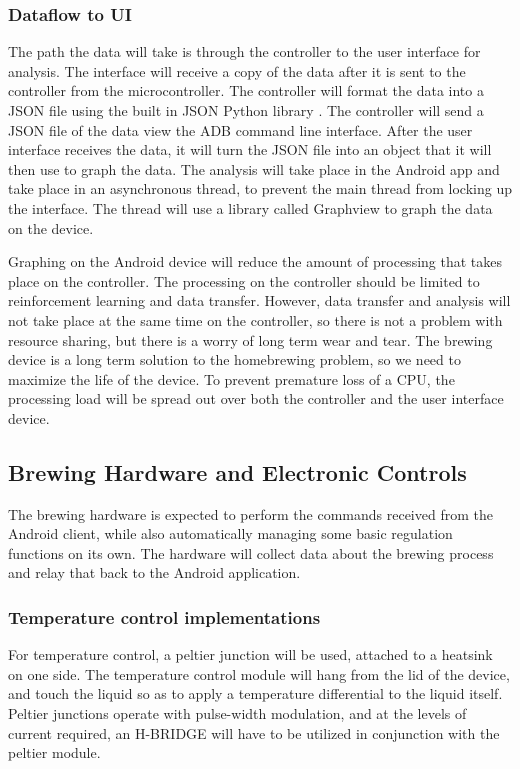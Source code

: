 \documentclass[draftclsnofoot,onecolumn,letterpaper,10pt]{IEEEtran}
\begin{document}
\subsubsection{Dataflow to UI}
The path the data will take is through the controller to the user interface for analysis.
The interface will receive a copy of the data after it is sent to the controller from the microcontroller.
The controller will format the data into a JSON file using the built in JSON Python library \cite{JSONPython}.
The controller will send a JSON file of the data view the ADB command line interface.
After the user interface receives the data, it will turn the JSON file into an object that it will then use to graph the data.
The analysis will take place in the Android app and take place in an asynchronous thread, to prevent the main thread from locking up the interface.
The thread will use a library called Graphview to graph the data on the device. \cite{Graphview}

Graphing on the Android device will reduce the amount of processing that takes place on the controller.
The processing on the controller should be limited to reinforcement learning and data transfer.
However, data transfer and analysis will not take place at the same time on the controller, so there is not a problem with resource sharing, but there is a worry of long term wear and tear.
The brewing device is a long term solution to the homebrewing problem, so we need to maximize the life of the device.
To prevent premature loss of a CPU, the processing load will be spread out over both the controller and the user interface device.

\subsection{Brewing Hardware and Electronic Controls} %
The brewing hardware is expected to perform the commands received from the Android client, while also automatically managing
some basic regulation functions on its own. The hardware will collect data about the brewing process and relay that back to the
Android application.

\subsubsection{Temperature control implementations}
For temperature control, a peltier junction will be used, attached to a heatsink on one side. The temperature control module will
hang from the lid of the device, and touch the liquid so as to apply a temperature differential to the liquid itself. Peltier junctions 
operate with pulse-width modulation, and at the levels of current required, an H-BRIDGE will have to be utilized in conjunction with the 
peltier module.
\end{document}
